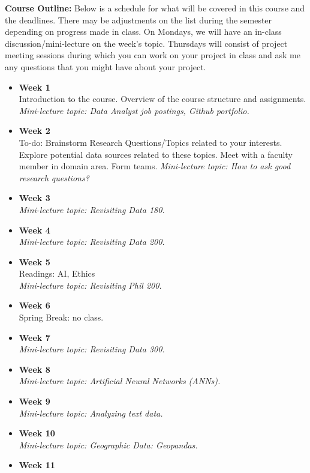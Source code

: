 \documentclass[11pt,letter]{article}
\begin{document}
\textbf{Course Outline:} Below is a schedule for what will be covered in this course and the deadlines. There may be adjustments on the list during the semester depending on progress made in class. On Mondays, we will have an in-class discussion/mini-lecture on the week's topic. Thursdays will consist of project meeting sessions during which you can work on your project in class and ask me any questions that you might have about your project. \\
\clearpage
\iffalse
\begin{itemize}[nosep]
  \item \textbf{Week 1}\\
    Introduction to the course. Overview of the course structure and assignments.
    \textit{Mini-lecture topic: Data Analyst job postings, Github portfolio.}
  \item \textbf{Week 2}\\
  To-do: Brainstorm Research Questions/Topics related to your interests. Explore potential data sources related to these topics. Meet with a faculty member in domain area. Form teams.
        \textit{Mini-lecture topic: How to ask good research questions?}
  \item \textbf{Week 3}\\
      \textit{Mini-lecture topic: Revisiting Data 180.}
  \item \textbf{Week 4}\\
      \textit{Mini-lecture topic: Revisiting Data 200.}
  \item \textbf{Week 5}\\
      Readings: AI, Ethics\\
      \textit{Mini-lecture topic: Revisiting Phil 200.}
  \item \textbf{Week 6}\\
      Spring Break: no class.
  \item \textbf{Week 7}\\
      \textit{Mini-lecture topic: Revisiting Data 300.}
  \item \textbf{Week 8}\\
      \textit{Mini-lecture topic: Artificial Neural Networks (ANNs).}
  \item \textbf{Week 9}\\
      \textit{Mini-lecture topic: Analyzing text data.}
  \item \textbf{Week 10}\\
      \textit{Mini-lecture topic: Geographic Data: Geopandas.}
  \item \textbf{Week 11}\\

\end{itemize}
\end{document}
